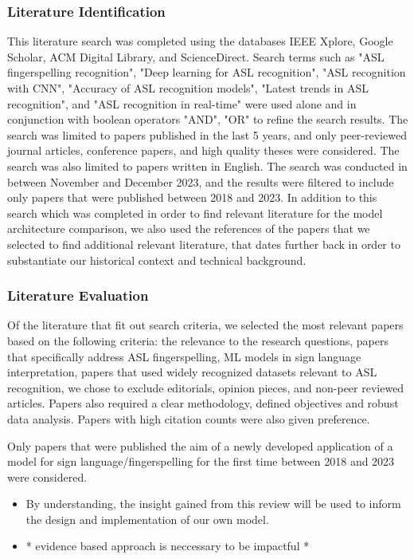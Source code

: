 \subsubsection{Literature Identification}
This literature search was completed using the databases IEEE Xplore, Google Scholar, ACM Digital Library, and ScienceDirect. Search terms such as "ASL fingerspelling recognition", "Deep learning for ASL recognition",  "ASL recognition with CNN", "Accuracy of ASL recognition models", "Latest trends in ASL recognition", and "ASL recognition in real-time" were used alone and in conjunction with boolean operators "AND", "OR" to refine the search results. The search was limited to papers published in the last 5 years, and only peer-reviewed journal articles, conference papers, and high quality theses were considered. The search was also limited to papers written in English. The search was conducted in between November and December 2023, and the results were filtered to include only papers that were published between 2018 and 2023.
In addition to this search which was completed in order to find relevant literature for the model architecture comparison, we also used the references of the papers that we selected to find additional relevant literature, that dates further back in order to substantiate our historical context and technical background.
\subsubsection{Literature Evaluation}
Of the literature that fit out search criteria, we selected the most relevant papers based on the following criteria: the relevance to the research questions, papers that specifically address ASL fingerspelling, ML models in sign language interpretation, papers that used widely recognized datasets relevant to ASL recognition, we chose to exclude editorials, opinion pieces, and non-peer reviewed articles. Papers also required a clear methodology, defined objectives and robust data analysis. Papers with high citation counts were also given preference.

Only papers that were published the aim of a newly developed application of a model for sign language/fingerspelling for the first time between 2018 and 2023 were considered.

\begin{itemize}
    \item By understanding, the insight gained from this review will be used to inform the design and implementation of our own model.
    \item * evidence based approach is neccessary to be impactful *

\end{itemize}

